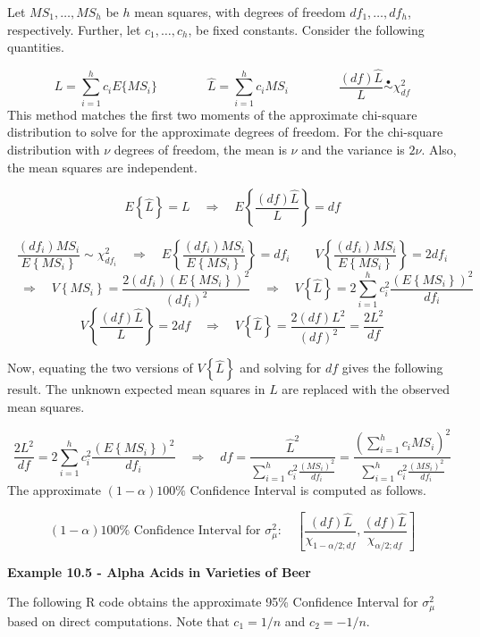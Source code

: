 \documentclass[
]{book}
\begin{document}
Let \(MS_1,\ldots,MS_h\) be \(h\) mean squares, with degrees of freedom
\(df_1,\ldots,df_h\), respectively. Further, let \(c_1,\ldots,c_h\), be
fixed constants. Consider the following quantities.

\[
L=\sum_{i=1}^hc_iE\{MS_i\}   \qquad\qquad
\hat{L} =\sum_{i=1}^hc_i MS_i \qquad\qquad
\frac{\left(df\right)\hat{L}}{L}  \stackrel{\bullet}{\sim} \chi_{df}^2
\] This method matches the first two moments of the approximate
chi-square distribution to solve for the approximate degrees of freedom.
For the chi-square distribution with \(\nu\) degrees of freedom, the
mean is \(\nu\) and the variance is \(2\nu\). Also, the mean squares are
independent.

\[
E\left\{\hat{L}\right\}=L \quad \Rightarrow \quad E\left\{\frac{\left(df\right)\hat{L}}{L}\right\}=df
\]

\[
\frac{\left(df_i\right)MS_i}{E\left\{MS_i\right\}} \sim \chi_{df_i}^2
\quad \Rightarrow \quad 
E\left\{\frac{\left(df_i\right)MS_i}{E\left\{MS_i\right\}}\right\}=df_i
\qquad
V\left\{\frac{\left(df_i\right)MS_i}{E\left\{MS_i\right\}}\right\}=2df_i
\] \[
\quad \Rightarrow \quad
V\left\{MS_i\right\}=\frac{2\left(df_i\right)\left(E\left\{MS_i\right\}\right)^2}{
\left(df_i\right)^2}
\quad \Rightarrow \quad
V\left\{\hat{L}\right\}=2\sum_{i=1}^hc_i^2\frac{\left(E\left\{MS_i\right\}\right)^2}{df_i}
\] \[
V\left\{\frac{\left(df\right)\hat{L}}{L}\right\}=2df
\quad \Rightarrow \quad
V\left\{\hat{L}\right\} = \frac{2(df)L^2}{(df)^2}=\frac{2L^2}{df}
\]

Now, equating the two versions of \(V\left\{\hat{L}\right\}\) and
solving for \(df\) gives the following result. The unknown expected mean
squares in \(L\) are replaced with the observed mean squares.

\[
\frac{2L^2}{df}=
2\sum_{i=1}^hc_i^2\frac{\left(E\left\{MS_i\right\}\right)^2}{df_i}
\quad \Rightarrow \quad
df = \frac{\hat{L}^2}{\sum_{i=1}^hc_i^2\frac{\left(MS_i\right)^2}{df_i}}=
\frac{\left(\sum_{i=1}^h c_iMS_i\right)^2}{\sum_{i=1}^hc_i^2\frac{\left(MS_i\right)^2}{df_i}}
\] The approximate \((1-\alpha)100\%\) Confidence Interval is computed
as follows.

\[
(1-\alpha)100\% \mbox{ Confidence Interval for } \sigma_{\mu}^2: \quad
\left[\frac{(df)\hat{L}}{\chi_{1-\alpha/2;df}},\frac{(df)\hat{L}}{\chi_{\alpha/2;df}}\right]
\]

\textbf{Example 10.5 - Alpha Acids in Varieties of Beer}

The following R code obtains the approximate 95\% Confidence Interval
for \(\sigma_{\mu}^2\) based on direct computations. Note that
\(c_1=1/n\) and \(c_2=-1/n\).
\end{document}
